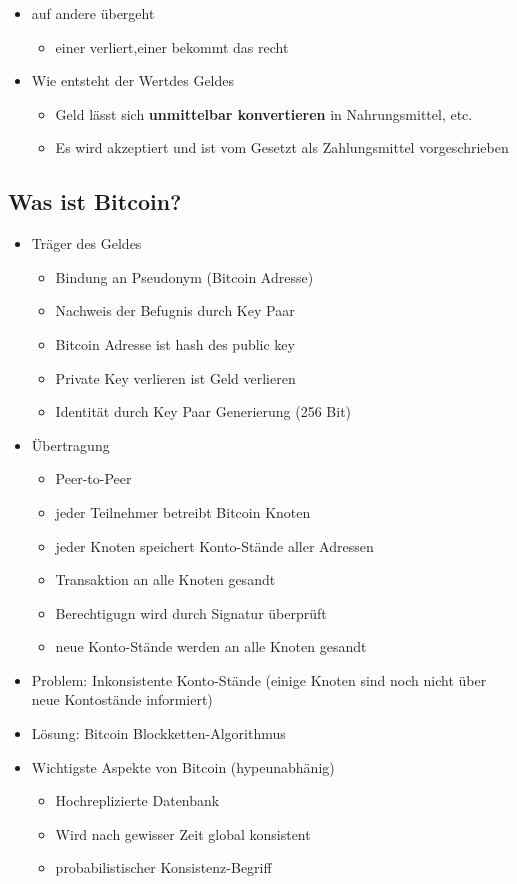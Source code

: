 \documentclass{article} %
\begin{document}
\begin{itemize}
\begin{itemize}
		\end{itemize}
		\item \glqq auf andere übergeht\grqq
		\begin{itemize}
			\item einer verliert,einer bekommt das recht
		\end{itemize}
		\item Wie entsteht der \glqq Wert\grqq des Geldes
		\begin{itemize}
			\item Geld lässt sich \textbf{unmittelbar konvertieren} in Nahrungsmittel, etc.
			\item Es wird akzeptiert und ist vom Gesetzt als Zahlungsmittel vorgeschrieben 
		\end{itemize}
	\end{itemize}
	\subsection{Was ist Bitcoin?}
	\begin{itemize}
		\item Träger des Geldes
		\begin{itemize}
			\item Bindung an Pseudonym (Bitcoin Adresse)
			\item Nachweis der Befugnis durch Key Paar
			\item Bitcoin Adresse ist hash des public key
			\item Private Key verlieren ist Geld verlieren
			\item Identität durch Key Paar Generierung (256 Bit)
		\end{itemize}
		\item Übertragung
		\begin{itemize}
			\item Peer-to-Peer
			\item jeder Teilnehmer betreibt Bitcoin Knoten
			\item jeder Knoten speichert Konto-Stände aller Adressen
			\item Transaktion an alle Knoten gesandt
			\item Berechtigugn wird durch Signatur überprüft
			\item neue Konto-Stände werden an alle Knoten gesandt
		\end{itemize}
		\item Problem: Inkonsistente Konto-Stände (einige Knoten sind noch nicht über neue Kontostände informiert)
		\item Lösung: Bitcoin Blockketten-Algorithmus
		\item Wichtigste Aspekte von Bitcoin (hypeunabhänig)
			\begin{itemize}
				\item Hochreplizierte Datenbank
				\item Wird nach gewisser Zeit global konsistent
				\item probabilistischer Konsistenz-Begriff
			\end{itemize}
	\end{itemize}
\end{document}
